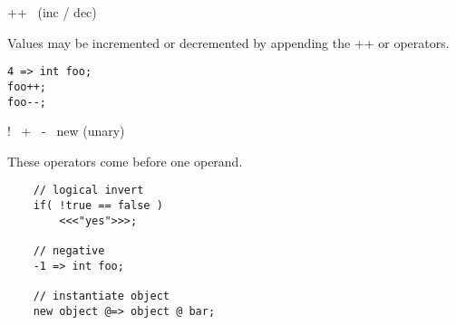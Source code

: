 ++~ \doubledash (inc / dec)

Values may be incremented or decremented by appending the ++ or \doubledash operators.
\begin{verbatim}
4 => int foo;
foo++;
foo--;
\end{verbatim}

!~ +~ -~ new (unary)

These operators come before one operand.
\begin{verbatim}
    // logical invert
    if( !true == false )
        <<<"yes">>>;

    // negative
    -1 => int foo;

    // instantiate object
    new object @=> object @ bar;
\end{verbatim}